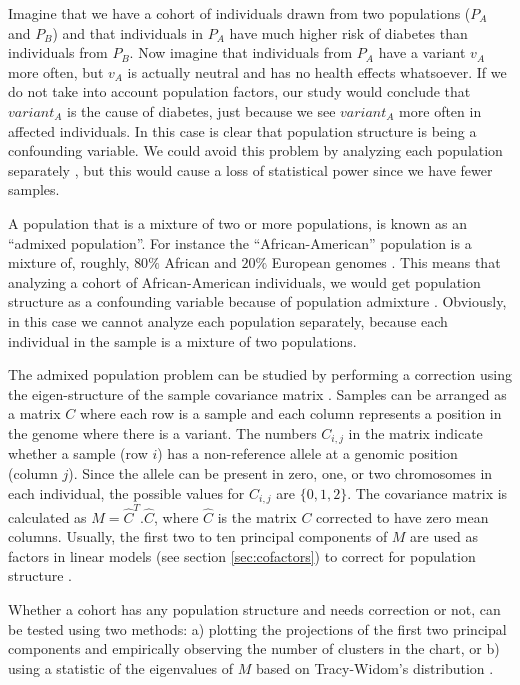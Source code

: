 Imagine that we have a cohort of individuals drawn from two populations ($P_A$ and $P_B$) and that individuals in $P_A$ have much higher risk of diabetes than individuals from $P_B$. Now imagine that individuals from $P_A$ have a variant $v_A$ more often, but $v_A$ is actually neutral and has no health effects whatsoever. If we do not take into account population factors, our study would conclude that $variant_A$ is the cause of diabetes, just because we see $variant_A$ more often in affected individuals. In this case is clear that population structure is being a confounding variable. We could avoid this problem by analyzing each population separately \cite{patterson2006population}, but this would cause a loss of statistical power since we have fewer samples.

A population that is a mixture of two or more populations, is known as an ``admixed population''. For instance the ``African-American'' population is a mixture of, roughly, $80\%$ African and $20\%$ European genomes \cite{hartl1997principles,balding2006tutorial}. This means that analyzing a cohort of African-American individuals, we would get population structure as a confounding variable because of population admixture \cite{hartl1997principles}. Obviously, in this case we cannot analyze each population separately, because each individual in the sample is a mixture of two populations.

The admixed population problem can be studied by performing a correction using the eigen-structure of the sample covariance matrix \cite{patterson2006population}. Samples can be arranged as a matrix $C$ where each row is a sample and each column represents a position in the genome where there is a variant. The numbers $C_{i,j}$ in the matrix indicate whether a sample (row $i$) has a non-reference allele at a genomic position (column $j$). Since the allele can be present in zero, one, or two chromosomes in each individual, the possible values for $C_{i,j}$ are $\{0, 1, 2\}$. The covariance matrix is calculated as $M= \hat{C}^T . \hat{C}$, where $\hat{C}$ is the matrix $C$ corrected to have zero mean columns. Usually, the first two to ten principal components of $M$ are used as factors in linear models (see section \ref{sec:cofactors}) to correct for population structure \cite{patterson2006population}.

Whether a cohort has any population structure and needs correction or not, can be tested using two methods: a) plotting the projections of the first two principal components and empirically observing the number of clusters in the chart, or b) using a statistic of the eigenvalues of $M$ based on Tracy-Widom's distribution \cite{patterson2006population}.

